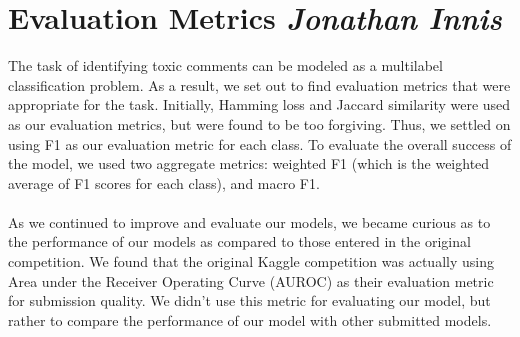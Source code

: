 \documentclass{article}
\begin{document}
\section{Evaluation Metrics \textit{Jonathan Innis}}{
  The task of identifying toxic comments can be modeled as a multilabel
  classification problem. As a result, we set out to find evaluation metrics
  that were appropriate for the task. Initially, Hamming loss
  and Jaccard similarity were used as our evaluation metrics, but were found to
  be too forgiving. Thus, we settled on using F1 as our evaluation metric
  for each class. To evaluate the overall success of the
  model, we used two aggregate metrics: weighted F1 (which is the weighted
  average of F1 scores for each class), and macro F1.
  \paragraph{}As we continued to improve and evaluate our models, we became
  curious as to the performance of our models as compared to those entered in
  the original competition. We found that the original Kaggle competition was
  actually using Area under the Receiver Operating Curve (AUROC) as their
  evaluation metric for submission quality. We didn't use this metric for
  evaluating our model, but rather to compare the performance of our model with
  other submitted models.
 }
\end{document}
